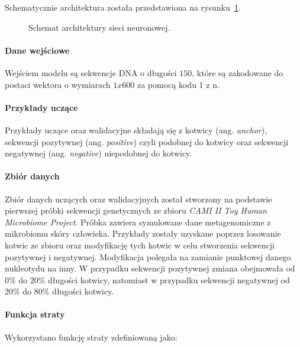                 Schematycznie architektura została przedstawiona na rysunku~\ref{Picture:NeuralModel}. 

                \begin{figure}
                    \begin{center}
                        
                    \end{center}
                    \caption{
                        Schemat architektury sieci neuronowej.
                    }\label{Picture:NeuralModel}
                \end{figure}

            \paragraph{Dane wejściowe}
                Wejściem modelu są sekwencje DNA o długości $150$, które są zakodowane do postaci wektora o wymiarach $1x600$ za pomocą kodu 1 z n\cite{Kod1zN}.
            
            \paragraph{Przykłady uczące}
                Przykłady uczące oraz walidacyjne składają się z kotwicy (ang. \textit{anchor}), sekwencji pozytywnej (ang. \textit{positive}) czyli podobnej do kotwicy oraz sekwencji negatywnej (ang. \textit{negative}) niepodobnej do kotwicy.
            
            \paragraph{Zbiór danych}
                Zbiór danych uczących oraz walidacyjnych został stworzony na podstawie pierwszej próbki sekwencji genetycznych ze zbioru \textit{CAMI II Toy Human Microbiome Project}\cite{Fritz2019}. Próbka zawiera symulowane dane metagenomiczne z mikrobiomu skóry człowieka. Przykłady zostały uzyskane poprzez losowanie kotwic ze zbioru oraz modyfikację tych kotwic w celu stworzenia sekwencji pozytywnej i negatywnej. Modyfikacja polegała na zamianie punktowej danego nukleotydu na inny. W przypadku sekwencji pozytywnej zmiana obejmowała od $0\%$ do $20\%$ długości kotwicy, natomiast w przypadku sekwencji negatywnej od $20\%$ do $80\%$ długości kotwicy.

            \paragraph{Funkcja straty}
                Wykorzystano funkcję straty zdefiniowaną jako:

